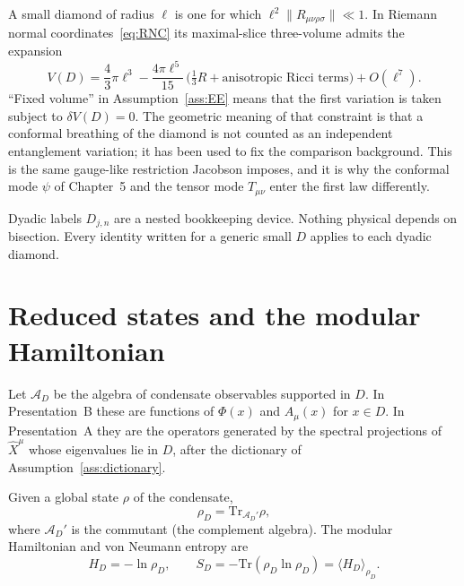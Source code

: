 A small diamond of radius \(\ell\) is one for which
\(\ell^2\|R_{\mu\nu\rho\sigma}\|\ll 1\). In Riemann normal
coordinates~\eqref{eq:RNC} its maximal-slice three-volume admits the
expansion
\begin{equation}
  \label{eq:vol-exp}
  V(D)
  =\frac43\pi\ell^3
   -\frac{4\pi\ell^5}{15}\,
     \bigl(\tfrac13 R+\text{anisotropic Ricci terms}\bigr)
   +O(\ell^7).
\end{equation}
``Fixed volume'' in Assumption~\ref{ass:EE} means that the first
variation is taken subject to \(\delta V(D)=0\). The geometric
meaning of that constraint is that a conformal breathing of the
diamond is not counted as an independent entanglement variation; it
has been used to fix the comparison background. This is the same
gauge-like restriction Jacobson imposes, and it is why the conformal
mode \(\psi\) of Chapter~5 and the tensor mode \(T_{\mu\nu}\) enter
the first law differently.

Dyadic labels \(D_{j,n}\) are a nested bookkeeping device. Nothing
physical depends on bisection. Every identity written for a generic
small \(D\) applies to each dyadic diamond.

\section{Reduced states and the modular Hamiltonian}
\label{sec:ch6-modular}

Let \(\mathcal{A}_D\) be the algebra of condensate observables
supported in \(D\). In Presentation~B these are functions of
\(\Phi(x)\) and \(A_\mu(x)\) for \(x\in D\). In Presentation~A they
are the operators generated by the spectral projections of
\(\hat X^\mu\) whose eigenvalues lie in \(D\), after the dictionary
of Assumption~\ref{ass:dictionary}.

\begin{definition}
  \label{def:rhoD}
  Given a global state \(\rho\) of the condensate,
  \begin{equation}
    \label{eq:rhoD}
    \rho_D=\mathrm{Tr}_{\mathcal{A}_D'}\rho,
  \end{equation}
  where \(\mathcal{A}_D'\) is the commutant (the complement algebra).
  The modular Hamiltonian and von Neumann entropy are
  \begin{equation}
    \label{eq:HD-SD}
    H_D=-\ln\rho_D,
    \qquad
    S_D=-\mathrm{Tr}(\rho_D\ln\rho_D)=\langle H_D\rangle_{\rho_D}.
  \end{equation}
\end{definition}

